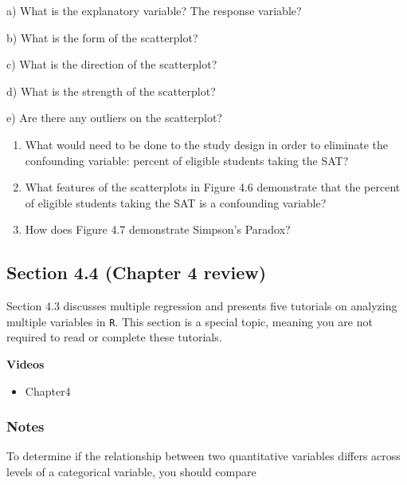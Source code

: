 \documentclass[
]{report}
\providecommand{\tightlist}{%
  \setlength{\itemsep}{0pt}\setlength{\parskip}{0pt}}
\newcommand{\rgs}{\vspace{12pt}} %
\newcommand{\rgi}{\hspace{24pt}}  %
\begin{document}
\rgi a) What is the explanatory variable? The response variable?
\rgs

\rgi b) What is the form of the scatterplot?
\rgs

\rgi c) What is the direction of the scatterplot?
\rgs

\rgi d) What is the strength of the scatterplot?
\rgs

\rgi e) Are there any outliers on the scatterplot?
\rgs

\begin{enumerate}
\def\labelenumi{\arabic{enumi}.}
\setcounter{enumi}{2}
\item
  What would need to be done to the study design in order to eliminate the confounding variable: percent of eligible students taking the SAT?
  \rgs
\item
  What features of the scatterplots in Figure 4.6 demonstrate that the percent of eligible students taking the SAT is a confounding variable?
  \rgs
\item
  How does Figure 4.7 demonstrate Simpson's Paradox?
  \rgs
\end{enumerate}

\hypertarget{section-4.4-chapter-4-review}{%
\subsection*{Section 4.4 (Chapter 4 review)}\label{section-4.4-chapter-4-review}}


Section 4.3 discusses multiple regression and presents five tutorials on analyzing multiple variables in \texttt{R}. This section is a special topic, meaning you are not required to read or complete these tutorials.

\textbf{Videos}

\begin{itemize}
\tightlist
\item
  Chapter4
\end{itemize}


\hypertarget{notes-14}{%
\subsubsection*{Notes}\label{notes-14}}

To determine if the relationship between two quantitative variables differs across levels of a categorical variable, you should compare
\rgs
\end{document}
